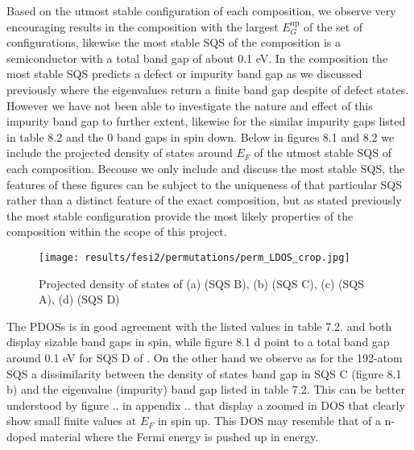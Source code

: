 Based on the utmost stable configuration of each composition, we observe very encouraging results in the  composition with the largest $E_G ^\text{up}$ of the set of configurations, likewise the most stable SQS of the  composition is a semiconductor with a total band gap of about 0.1 eV. In the composition  the most stable SQS predicts a defect or impurity band gap as we discussed previously where the eigenvalues return a finite band gap despite of defect states. However we have not been able to investigate the nature and effect of this impurity band gap to further extent, likewise for the similar impurity gaps listed in table 8.2 and the 0 band gaps in spin down. Below in figures 8.1 and 8.2 we include the projected density of states around $E_F$ of the utmost stable SQS of each composition. Becouse we only include and discuss the most stable SQS, the features of these figures can be subject to the uniqueness of that particular SQS rather than a distinct feature of the exact composition, but as stated previously the most stable configuration provide the most likely properties of the composition within the scope of this project. 

\begin{figure}[H]
\texttt{[image: results/fesi2/permutations/perm\_LDOS\_crop.jpg]}
\caption{Projected density of states of (a)  (SQS B), (b)  (SQS C), (c)  (SQS A), (d)  (SQS D)}
\end{figure}

The PDOSs is in good agreement with the listed values in table 7.2.   and  both display sizable band gaps in spin, while figure 8.1 d point to a total band gap around 0.1 eV for SQS D of . On the other hand we observe as for the 192-atom SQS a dissimilarity between the density of states band gap in  SQS C (figure 8.1 b) and the eigenvalue (impurity) band gap listed in table 7.2. This can be better understood by figure .. in appendix .. that display a zoomed in DOS that clearly show small finite values at $E_F$ in spin up. This DOS may resemble that of a n-doped material where the Fermi energy is pushed up in energy.    


